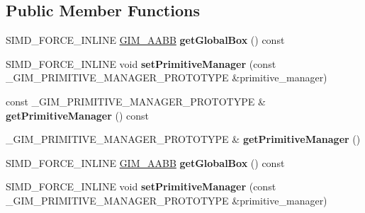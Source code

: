 \subsection*{Public Member Functions}
\begin{DoxyCompactItemize}
\item 
\mbox{\label{classGIM__BOX__TREE__TEMPLATE__SET_ab7da5b02f219f1b432918458dc80d928}} 
S\+I\+M\+D\+\_\+\+F\+O\+R\+C\+E\+\_\+\+I\+N\+L\+I\+NE \hyperlink{classGIM__AABB}{G\+I\+M\+\_\+\+A\+A\+BB} {\bfseries get\+Global\+Box} () const
\item 
\mbox{\label{classGIM__BOX__TREE__TEMPLATE__SET_a6830317f605b98492bc09426a5e6e1ee}} 
S\+I\+M\+D\+\_\+\+F\+O\+R\+C\+E\+\_\+\+I\+N\+L\+I\+NE void {\bfseries set\+Primitive\+Manager} (const \+\_\+\+G\+I\+M\+\_\+\+P\+R\+I\+M\+I\+T\+I\+V\+E\+\_\+\+M\+A\+N\+A\+G\+E\+R\+\_\+\+P\+R\+O\+T\+O\+T\+Y\+PE \&primitive\+\_\+manager)
\item 
\mbox{\label{classGIM__BOX__TREE__TEMPLATE__SET_a2b079418648fa9ffb25d7befc2736b7f}} 
const \+\_\+\+G\+I\+M\+\_\+\+P\+R\+I\+M\+I\+T\+I\+V\+E\+\_\+\+M\+A\+N\+A\+G\+E\+R\+\_\+\+P\+R\+O\+T\+O\+T\+Y\+PE \& {\bfseries get\+Primitive\+Manager} () const
\item 
\mbox{\label{classGIM__BOX__TREE__TEMPLATE__SET_aa4484dfef41de1058825308d8a19e025}} 
\+\_\+\+G\+I\+M\+\_\+\+P\+R\+I\+M\+I\+T\+I\+V\+E\+\_\+\+M\+A\+N\+A\+G\+E\+R\+\_\+\+P\+R\+O\+T\+O\+T\+Y\+PE \& {\bfseries get\+Primitive\+Manager} ()
\item 
\mbox{\label{classGIM__BOX__TREE__TEMPLATE__SET_ab7da5b02f219f1b432918458dc80d928}} 
S\+I\+M\+D\+\_\+\+F\+O\+R\+C\+E\+\_\+\+I\+N\+L\+I\+NE \hyperlink{classGIM__AABB}{G\+I\+M\+\_\+\+A\+A\+BB} {\bfseries get\+Global\+Box} () const
\item 
\mbox{\label{classGIM__BOX__TREE__TEMPLATE__SET_a6830317f605b98492bc09426a5e6e1ee}} 
S\+I\+M\+D\+\_\+\+F\+O\+R\+C\+E\+\_\+\+I\+N\+L\+I\+NE void {\bfseries set\+Primitive\+Manager} (const \+\_\+\+G\+I\+M\+\_\+\+P\+R\+I\+M\+I\+T\+I\+V\+E\+\_\+\+M\+A\+N\+A\+G\+E\+R\+\_\+\+P\+R\+O\+T\+O\+T\+Y\+PE \&primitive\+\_\+manager)

\end{DoxyCompactItemize}
